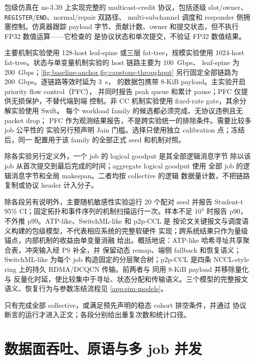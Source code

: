 包级仿真在 ns-3.39 上实现完整的 multicast-credit 协议，包括逐级
slot/owner、\texttt{REGISTER}/\texttt{END}、normal/repair 双路径、
multi-subchannel 调度和 responder 侧拥塞控制。仿真器跟踪 payload
字节、贡献计数、owner 和提交状态，但不执行 FP32 数值运算——它检查的
是协议状态和单次提交，不验证 FP32 数值结果。

主要机制实验使用 128-host leaf-spine 或三层 fat-tree，规模实验使用
1024-host fat-tree。状态与单变量机制实验的 host 链路主要为 100~Gbps、
leaf-spine 为 200~Gbps；\cref{fig:baseline-anchor,fig:capstone-throughput}
另行固定全部链路为 200~Gbps。逐链路等效时延为 3~\textmu s，\sysname
的数据包携带 8-KiB payload。主实验开启 priority flow control（PFC），
并同时报告 peak queue 和累计 pause；PFC 仅提供无损保护，不替代端到端
控制。非 CC 机制实验使用 fixed-rate gate，其余分解实验使用 Swift。
每个 workload family 的候选都必须完成、无协议违例且无 packet drop；
PFC 作为观测结果报告，不是跨实验统一的排除条件。需要比较多 job 公平性的
实验另行预声明 Jain 门槛。选择只使用独立 calibration 点；冻结后，同一
配置用于该 family 的全部正式 seed 和机制对照。

除各实验另行定义外，一个 job 的 logical goodput 是其全部逻辑消息字节
除以该 job 从首次提交到最后完成的时间；aggregate logical goodput 使用
全部 job 的逻辑消息字节和全局 makespan。二者均按 collective 的逻辑
数据量计数，不把链路复制或协议 header 计入分子。

除各段另有说明外，主要随机敏感性实验运行 20 个配对 seed 并报告
Student-t 95\% CI；固定拓扑和事件序列的机制扫描运行一次。样本不足
$10^4$ 时报告 p90，不外推 p99。ATP-like、SwitchML-like 和 p2p-CCL 是
按论文关键报文与调度语义构建的包级模型，不代表相应系统的完整软硬件
实现；跨系统结果只作为量级锚点，\sysname 内部机制的收益由单变量消融
给出。概括地说：ATP-like 哈希寻址共享聚合表，冲突输入经 PS 补全，并
保留动态 remap、端侧 fallback 和恢复语义；SwitchML-like 为每个 job
构造固定的分层聚合树；p2p-CCL 是四条 NCCL-style ring 上的持久
RDMA/DCQCN 传输。前两者与 \sysname 同用 8-KiB payload 并移除量化与
反量化时延，使比较集中于寻址、状态分配和传输语义。三个模型的完整报文
语义、恢复行为与参数冻结流程见 \cref{app:sim-models}。

只有完成全部 collective，或满足预先声明的稳态 cohort 排空条件，并通过
协议断言的运行才进入正文；各段分别给出重复次数和统计口径。

\section{数据面吞吐、原语与多 job 并发}
\label{ssec:eval-throughput}
\label{ssec:eval-primitives}
\label{ssec:eval-capstone}

